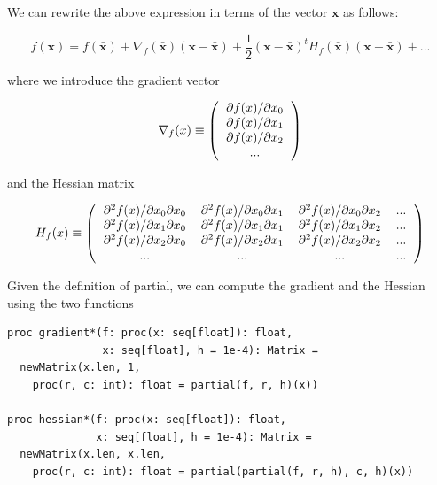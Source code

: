 \documentclass[justified, sixbynine]{tufte-book}
\def\ft{\small\tt}
\theoremstyle{plain}%
\newtheorem * {corollary}{Corollary}
\theoremstyle{definition}
\theoremstyle{remark}
\newtheorem * {remark}{Remark}
\newtheorem * {note}{Note}
\begin{document}
\begin{fullwidth}
We can rewrite the above expression in terms of the vector $\mathbf{x}$ as follows:

\begin{equation}
f(\mathbf{x}) = f(\mathbf{\bar x}) + \nabla_f(\mathbf{\bar x})(\mathbf{x}-\mathbf{\bar x})
+ \frac12 (\mathbf{x}-\mathbf{\bar x})^t H_f(\mathbf{\bar x})(\mathbf{x}-\mathbf{\bar x}) + ...
\end{equation}

where we introduce the gradient vector

\begin{equation}
\nabla_f(x) \equiv \left(
\begin{tabular}{c}
$\partial f(x)/\partial x_0$ \\
$\partial f(x)/\partial x_1$ \\
$\partial f(x)/\partial x_2$ \\
...
\end{tabular}
\right)
\end{equation}

and the Hessian matrix

\begin{equation}
H_f(x) \equiv \left(
\begin{tabular}{cccc}
$\partial^2 f(x)/\partial x_0\partial x_0$ &
$\partial^2 f(x)/\partial x_0\partial x_1$ &
$\partial^2 f(x)/\partial x_0\partial x_2$ &
... \\
$\partial^2 f(x)/\partial x_1\partial x_0$ &
$\partial^2 f(x)/\partial x_1\partial x_1$ &
$\partial^2 f(x)/\partial x_1\partial x_2$ &
... \\
$\partial^2 f(x)/\partial x_2\partial x_0$ &
$\partial^2 f(x)/\partial x_2\partial x_1$ &
$\partial^2 f(x)/\partial x_2\partial x_2$ &
... \\
... & ... & ... & ...
\end{tabular}
\right)
\end{equation}

Given the definition of partial, we can compute the gradient and the Hessian using the two functions

\begin{lstlisting}[caption={in file: {\ft nlib/calculus.nim}}]
proc gradient*(f: proc(x: seq[float]): float,
               x: seq[float], h = 1e-4): Matrix =
  newMatrix(x.len, 1,
    proc(r, c: int): float = partial(f, r, h)(x))

proc hessian*(f: proc(x: seq[float]): float,
              x: seq[float], h = 1e-4): Matrix =
  newMatrix(x.len, x.len,
    proc(r, c: int): float = partial(partial(f, r, h), c, h)(x))
\end{lstlisting}


\end{fullwidth}
\end{document}

